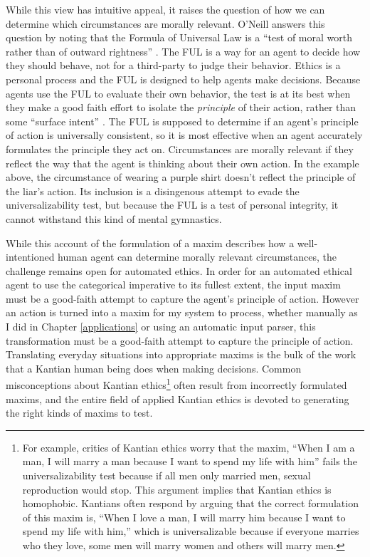 \begin{isabellebody}
\begin{isamarkuptext}
While this view has intuitive appeal, it raises the question of how we can determine
which circumstances are morally relevant. O'Neill answers this question by noting that the Formula of Universal Law is 
a ``test of moral worth rather than of outward rightness'' \citep[98]{constofreason}. The FUL is a way 
for an agent to decide how they should behave, not for a third-party to judge their behavior. Ethics is 
a personal process and the FUL is designed to help agents make decisions. Because agents use 
the FUL to evaluate their own behavior, the test is at its 
best when they make a good faith effort to isolate the \emph{principle} of their action, rather than some
``surface intent'' \citep[87]{constofreason}. The FUL is supposed to determine if an agent's principle of action
is universally consistent, so it is most effective when an agent accurately formulates the principle
they act on. Circumstances are morally relevant if they reflect the way that the agent is 
thinking about their own action. In the example above, the circumstance of wearing a purple shirt doesn't reflect
the principle of the liar's action. Its inclusion is a disingenous attempt to evade the universalizability
test, but because the FUL is a test of personal integrity, it cannot withstand this kind of mental
gymnastics.

While this account of the formulation of a maxim describes how a well-intentioned human agent can determine 
morally relevant circumstances, the challenge remains open for automated ethics. In order for an automated
ethical agent to use the categorical imperative to its fullest extent, the input maxim must be a good-faith 
attempt to capture the agent's principle
of action. However an action is turned into a maxim for my system to process, whether manually as I did
in Chapter \ref{applications} or using an automatic input parser, this transformation must be a good-faith 
attempt to capture the principle of action. Translating everyday situations into appropriate maxims is 
the bulk of the work that a Kantian human 
being does when making decisions. Common misconceptions about Kantian ethics\footnote{For example, critics 
of Kantian ethics worry that the maxim, ``When I am a
man, I will marry a man because I want to spend my life with him'' fails the universalizability
test because if all men only married men, sexual reproduction would stop. This argument implies 
that Kantian ethics is homophobic. Kantians often respond by arguing that the correct formulation of 
this maxim is, ``When I love a man, I will marry him because I want to spend my life with him,'' which
is universalizable because if everyone marries who they love, some men will marry women and others will
marry men.} often result from incorrectly formulated maxims, 
and the entire field of applied Kantian ethics is devoted to generating the right kinds of maxims to test. 


\end{isamarkuptext}
\end{isabellebody}
